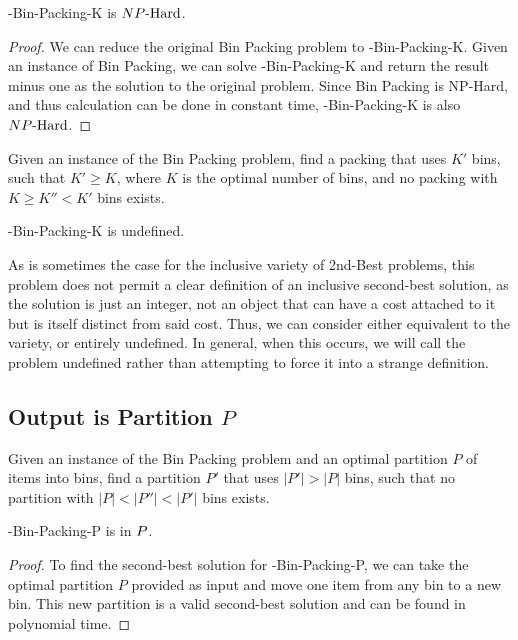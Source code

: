 \begin{theorem}
\exb{}-Bin-Packing-K is ${NP\text{-Hard{}}}$.
\end{theorem}
\begin{proof}
We can reduce the original Bin Packing problem to \exb{}-Bin-Packing-K. Given an instance of Bin Packing, we can solve \exb{}-Bin-Packing-K and return the result minus one as the solution to the original problem. Since Bin Packing is NP-Hard, and thus calculation can be done in constant time, \exb{}-Bin-Packing-K is also ${NP\text{-Hard{}}}$.
\end{proof}

\begin{definition}
Given an instance of the Bin Packing problem, find a packing that uses $K'$ bins, such that $K' \geq K$, where $K$ is the optimal number of bins, and no packing with $K \geq K'' < K'$ bins exists.
\end{definition}

\begin{theorem}
\inob{}-Bin-Packing-K is undefined.
\end{theorem}
As is sometimes the case for the inclusive variety of 2nd-Best problems, this problem does not permit a clear definition of an inclusive second-best solution, as the solution is just an integer, not an object that can have a cost attached to it but is itself distinct from said cost. Thus, we can consider  either equivalent to the \exob{} variety, or entirely undefined. In general, when this occurs, we will call the problem undefined rather than attempting to force it into a strange definition. \newline

\subsection{Output is Partition $P$}
\begin{definition}
Given an instance of the Bin Packing problem and an optimal partition $P$ of items into bins, find a partition $P'$ that uses $|P'| > |P|$ bins, such that no partition with $|P| < |P''| < |P'|$ bins exists.
\end{definition}

\begin{theorem}
\exob{}-Bin-Packing-P is in ${P}{}$.
\end{theorem}
\begin{proof}
To find the second-best solution for \exob{}-Bin-Packing-P, we can take the optimal partition $P$ provided as input and move one item from any bin to a new bin. This new partition is a valid second-best solution and can be found in polynomial time.
\end{proof}

